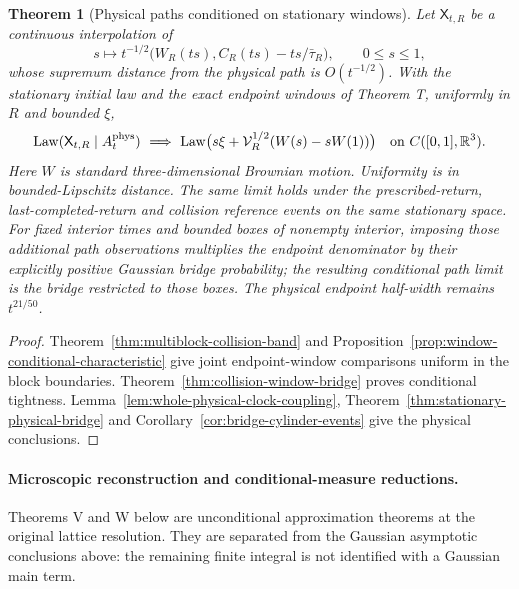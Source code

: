 \documentclass[11pt,reqno]{amsart}
\numberwithin{equation}{section}
\newtheorem{maintheorem}{Theorem}
\theoremstyle{definition}\newtheorem{definition}[theorem]{Definition}
\theoremstyle{remark}\newtheorem{remark}[theorem]{Remark}
\newcommand{\R}{\mathbb R}\newcommand{\Z}{\mathbb Z}\newcommand{\T}{\mathbb T}
\begin{document}
\begin{maintheorem}[Physical paths conditioned on stationary windows]
\label{thm:intro-stationary-window-bridge}
Let $\mathsf X_{t,R}$ be a continuous interpolation of
\[
 s\longmapsto t^{-1/2}
   \bigl(W_R(ts),C_R(ts)-ts/\bar\tau_R\bigr),\qquad 0\le s\le1,
\]
whose supremum distance from the physical path is $O(t^{-1/2})$.
With the stationary initial law and the exact endpoint windows of
Theorem T, uniformly in $R$ and bounded $\xi$,
\[
 \operatorname{Law}(\mathsf X_{t,R}\mid A_t^{\rm phys})
       \ \Longrightarrow\
 \operatorname{Law}\bigl(s\xi+
     \mathcal V_R^{1/2}(W(s)-sW(1))\bigr)
       \quad\hbox{on }C([0,1],\R^3).
\]
Here $W$ is standard three-dimensional Brownian motion. Uniformity
is in bounded-Lipschitz distance. The same limit holds under the
prescribed-return, last-completed-return and collision reference events
on the same stationary space. For fixed interior times and bounded
boxes of nonempty interior, imposing those additional path observations
multiplies the endpoint denominator by their explicitly positive
Gaussian bridge probability; the resulting conditional path limit is
the bridge restricted to those boxes. The physical endpoint half-width
remains $t^{21/50}$.
\end{maintheorem}
\begin{proof}
Theorem~\ref{thm:multiblock-collision-band} and
Proposition~\ref{prop:window-conditional-characteristic} give joint
endpoint-window comparisons uniform in the block boundaries.
Theorem~\ref{thm:collision-window-bridge} proves conditional tightness.
Lemma~\ref{lem:whole-physical-clock-coupling},
Theorem~\ref{thm:stationary-physical-bridge} and
Corollary~\ref{cor:bridge-cylinder-events} give the physical conclusions.
\end{proof}

\paragraph{Microscopic reconstruction and conditional-measure reductions.}
Theorems V and W below are unconditional approximation theorems at the
original lattice resolution. They are separated from the Gaussian
asymptotic conclusions above: the remaining finite integral is not
identified with a Gaussian main term.
\end{document}
